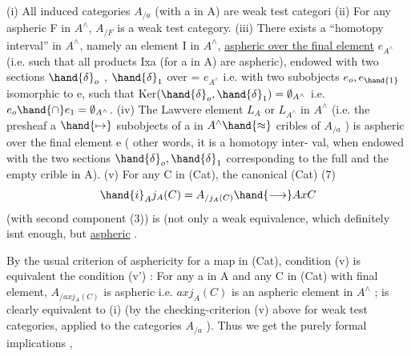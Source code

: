 (i)  All induced categories $A_{/a}$  (with a in A) are weak test categori
(ii)  For any aspheric F in $A^\wedge$, $A_{/F}$ is a weak test category.
(iii)  There exists a  ``homotopy interval'' in $A^\wedge$,  namely an element
 I in $A^\wedge$, \uline{aspheric over the final element} $e_{A^\wedge}$ (i.e. such that
all products Ixa (for a in A) are  aspheric),  endowed with
two sections $\hand{\delta}_o$  , $\hand{\delta}_1$ over  = $e_{A^\wedge}$ i.e. with two subobjects
$e_o,e_{\hand{1}}$   isomorphic to e,  such that  Ker$(\hand{\delta}_o,\hand{\delta}_1) = \emptyset_{A^\wedge}$
i.e. $e_o\hand{\cap}e_1 = \emptyset_{A^\wedge}$.
(iv)  The Lawvere element $L_A$ or $L_{A^\wedge}$ in $A^\wedge$ (i.e. the  presheaf
a $\hand{\mapsto}$ subobjects of a in $A^\wedge \hand{\approx}$ cribles of $A_{/a}$ )  is aspheric over
the final element e  ( other words, it is a homotopy inter-%
val,  when endowed with the two sections $\hand{\delta}_o,\hand{\delta}_1$  corresponding
to the  full and the empty crible in A).
(v)  For any  C in (Cat),  the canonical   (Cat)
(7) \[ \hand{i}_A j_A(C) = A_{/j_A(C)} \hand{\longrightarrow} AxC \]
(with second component (3))  is (not only a weak equivalence,
which definitely isnt enough,  but \hand{)}\uline{aspheric} .

By the usual criterion of asphericity for a map in (Cat),  condition
(v)  is equivalent   the condition  (v') :  For any a in A and any C
in (Cat) with final element,  $A_{/axj_A(C)}$  is aspheric i.e.  $axj_A(C)$  is an
aspheric element in $A^\wedge$ ;    is clearly equivalent to (i)  (by the
checking-criterion (v) above for weak test categories,  applied to the
categories $A_{/a}$ ). Thus we get the purely formal implications
\unsure{\xout{,}} ,

